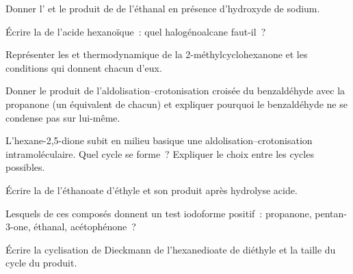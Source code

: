 \begin{exercise}[$\star$]\label{exo:b2:enolates-aldol:3}
Donner l' et le produit de  de l'éthanal en présence d'hydroxyde de sodium.
\end{exercise}

\begin{exercise}[$\star$]\label{exo:b2:enolates-aldol:4}
Écrire la  de l'acide hexanoïque~: quel halogénoalcane faut-il~?
\end{exercise}

\begin{exercise}[$\star\star$]\label{exo:b2:enolates-aldol:5}
Représenter les  et thermodynamique de la 2-méthylcyclohexanone et les conditions
qui donnent chacun d'eux.
\end{exercise}

\begin{exercise}[$\star\star$]\label{exo:b2:enolates-aldol:6}
Donner le produit de l'aldolisation--crotonisation croisée du benzaldéhyde avec la propanone (un
équivalent de chacun) et expliquer pourquoi le benzaldéhyde ne se condense pas sur lui-même.
\end{exercise}

\begin{exercise}[$\star\star$]\label{exo:b2:enolates-aldol:7}
L'hexane-2,5-dione subit en milieu basique une aldolisation--crotonisation intramoléculaire. Quel cycle
se forme~? Expliquer le choix entre les cycles possibles.
\end{exercise}

\begin{exercise}[$\star\star$]\label{exo:b2:enolates-aldol:8}
Écrire la  de l'éthanoate d'éthyle et son produit après hydrolyse acide.
\end{exercise}

\begin{exercise}[$\star\star$]\label{exo:b2:enolates-aldol:9}
Lesquels de ces composés donnent un test iodoforme positif~: propanone, pentan-3-one, éthanal, acétophénone~?
\end{exercise}

\begin{exercise}[$\star\star\star$]\label{exo:b2:enolates-aldol:10}
Écrire la cyclisation de Dieckmann de l'hexanedioate de diéthyle et la taille du cycle du produit.
\end{exercise}

